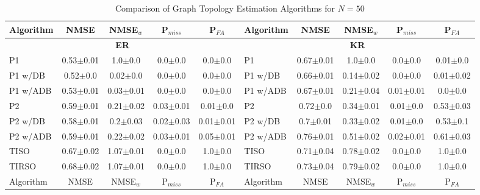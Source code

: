 \begin{table*}[htbp]
\centering
\caption{Comparison of Graph Topology Estimation Algorithms for $N=50$}
\label{tab:graph_estimation}
\setlength{\tabcolsep}{4pt}
\setlength{\aboverulesep}{0pt}
\setlength{\belowrulesep}{0pt}
\renewcommand{\arraystretch}{1.1}
\small
\begin{tabular}{lcccc|lcccc}
\toprule
Algorithm & NMSE & NMSE$_w$ & P$_{miss}$ & P$_{FA}$ & Algorithm & NMSE & NMSE$_w$ & P$_{miss}$ & P$_{FA}$ \\
\midrule
\multicolumn{5}{c}{\textbf{ER}} & \multicolumn{5}{c}{\textbf{KR}} \\
\midrule
P1 & 0.53{\tiny$\pm$0.01} & 1.0{\tiny$\pm$0.0} & 0.0{\tiny$\pm$0.0} & 0.0{\tiny$\pm$0.0}  & P1 & 0.67{\tiny$\pm$0.01} & 1.0{\tiny$\pm$0.0} & 0.0{\tiny$\pm$0.0} & 0.01{\tiny$\pm$0.0}  \\
P1 w/DB & 0.52{\tiny$\pm$0.0} & 0.02{\tiny$\pm$0.0} & 0.0{\tiny$\pm$0.0} & 0.0{\tiny$\pm$0.0}  & P1 w/DB & 0.66{\tiny$\pm$0.01} & 0.14{\tiny$\pm$0.02} & 0.0{\tiny$\pm$0.0} & 0.01{\tiny$\pm$0.02}  \\
P1 w/ADB & 0.53{\tiny$\pm$0.01} & 0.03{\tiny$\pm$0.01} & 0.0{\tiny$\pm$0.0} & 0.0{\tiny$\pm$0.0}  & P1 w/ADB & 0.67{\tiny$\pm$0.01} & 0.21{\tiny$\pm$0.04} & 0.01{\tiny$\pm$0.01} & 0.0{\tiny$\pm$0.0}  \\
P2 & 0.59{\tiny$\pm$0.01} & 0.21{\tiny$\pm$0.02} & 0.03{\tiny$\pm$0.01} & 0.01{\tiny$\pm$0.0}  & P2 & 0.72{\tiny$\pm$0.0} & 0.34{\tiny$\pm$0.01} & 0.01{\tiny$\pm$0.0} & 0.53{\tiny$\pm$0.03}  \\
P2 w/DB & 0.58{\tiny$\pm$0.01} & 0.2{\tiny$\pm$0.03} & 0.02{\tiny$\pm$0.03} & 0.01{\tiny$\pm$0.01}  & P2 w/DB & 0.7{\tiny$\pm$0.01} & 0.33{\tiny$\pm$0.02} & 0.01{\tiny$\pm$0.0} & 0.53{\tiny$\pm$0.1}  \\
P2 w/ADB & 0.59{\tiny$\pm$0.01} & 0.22{\tiny$\pm$0.02} & 0.03{\tiny$\pm$0.01} & 0.05{\tiny$\pm$0.01}  & P2 w/ADB & 0.76{\tiny$\pm$0.01} & 0.51{\tiny$\pm$0.02} & 0.02{\tiny$\pm$0.01} & 0.61{\tiny$\pm$0.03}  \\
TISO & 0.67{\tiny$\pm$0.02} & 1.07{\tiny$\pm$0.01} & 0.0{\tiny$\pm$0.0} & 1.0{\tiny$\pm$0.0}  & TISO & 0.71{\tiny$\pm$0.04} & 0.78{\tiny$\pm$0.02} & 0.0{\tiny$\pm$0.0} & 1.0{\tiny$\pm$0.0}  \\
TIRSO & 0.68{\tiny$\pm$0.02} & 1.07{\tiny$\pm$0.01} & 0.0{\tiny$\pm$0.0} & 1.0{\tiny$\pm$0.0}  & TIRSO & 0.73{\tiny$\pm$0.04} & 0.79{\tiny$\pm$0.02} & 0.0{\tiny$\pm$0.0} & 1.0{\tiny$\pm$0.0}  \\
\midrule[1.5pt]
Algorithm & NMSE & NMSE$_w$ & P$_{miss}$ & P$_{FA}$ & Algorithm & NMSE & NMSE$_w$ & P$_{miss}$ & P$_{FA}$ \\

\end{tabular}
\end{table*}
